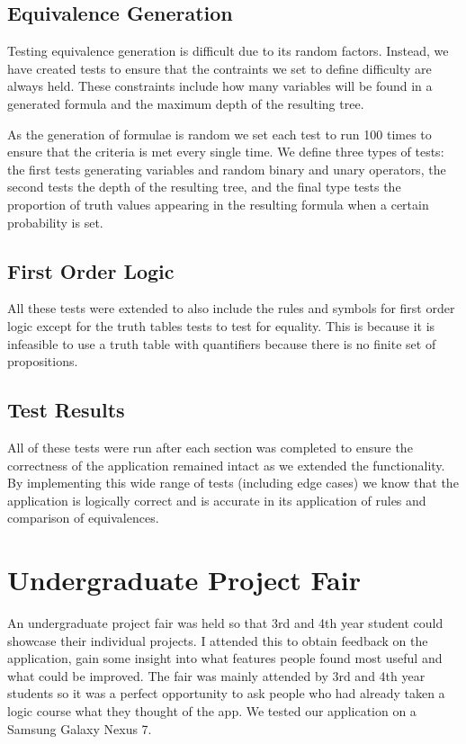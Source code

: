 \documentclass{report}
\begin{document}
\subsection{Equivalence Generation}

Testing equivalence generation is difficult due to its random factors. Instead, we have created tests to ensure that the contraints we set to define difficulty are always held. These constraints include how many variables will be found in a generated formula and the maximum depth of the resulting tree.

As the generation of formulae is random we set each test to run 100 times to ensure that the criteria is met every single time. We define three types of tests: the first tests generating variables and random binary and unary operators, the second tests the depth of the resulting tree, and the final type tests the proportion of truth values appearing in the resulting formula when a certain probability is set.

\subsection{First Order Logic}

All these tests were extended to also include the rules and symbols for first order logic except for the truth tables tests to test for equality. This is because it is infeasible to use a truth table with quantifiers because there is no finite set of propositions.

\subsection{Test Results}

All of these tests were run after each section was completed to ensure the correctness of the application remained intact as we extended the functionality. By implementing this wide range of tests (including edge cases) we know that the application is logically correct and is accurate in its application of rules and comparison of equivalences.

\section{Undergraduate Project Fair}

An undergraduate project fair was held so that 3rd and 4th year student could showcase their individual projects. I attended this to obtain feedback on the application, gain some insight into what features people found most useful and what could be improved. The fair was mainly attended by 3rd and 4th year students so it was a perfect opportunity to ask people who had already taken a logic course what they thought of the app. We tested our application on a Samsung Galaxy Nexus 7.
\end{document}
